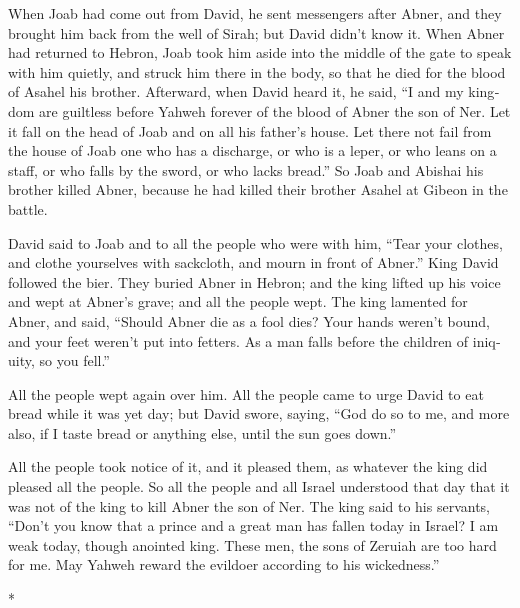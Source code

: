 \begin{paracol}{2}
\begin{otherlanguage}{english}
 When Joab had come out from David, he sent messengers
after Abner, and they brought him back from the well of Sirah; but David
didn't know it.  When Abner had returned to Hebron, Joab
took him aside into the middle of the gate to speak with him quietly,
and struck him there in the body, so that he died for the blood of
Asahel his brother.  Afterward, when David heard it, he
said, ``I and my kingdom are guiltless before Yahweh forever of the
blood of Abner the son of Ner.  Let it fall on the head
of Joab and on all his father's house. Let there not fail from the house
of Joab one who has a discharge, or who is a leper, or who leans on a
staff, or who falls by the sword, or who lacks bread.'' 
So Joab and Abishai his brother killed Abner, because he had killed
their brother Asahel at Gibeon in the battle.

 David said to Joab and to all the people who were with
him, ``Tear your clothes, and clothe yourselves with sackcloth, and
mourn in front of Abner.'' King David followed the bier. 
They buried Abner in Hebron; and the king lifted up his voice and wept
at Abner's grave; and all the people wept.  The king
lamented for Abner, and said, ``Should Abner die as a fool dies?
 Your hands weren't bound, and your feet weren't put into
fetters. As a man falls before the children of iniquity, so you fell.''

All the people wept again over him.  All the people came
to urge David to eat bread while it was yet day; but David swore,
saying, ``God do so to me, and more also, if I taste bread or anything
else, until the sun goes down.''

 All the people took notice of it, and it pleased them,
as whatever the king did pleased all the people.  So all
the people and all Israel understood that day that it was not of the
king to kill Abner the son of Ner.  The king said to his
servants, ``Don't you know that a prince and a great man has fallen
today in Israel?  I am weak today, though anointed king.
These men, the sons of Zeruiah are too hard for me. May Yahweh reward
the evildoer according to his wickedness.''

\end{otherlanguage}

\switchcolumn[0]*

\hypertarget{asesinato-de-isboseth-coronaciuxf3n-de-david-como-rey-de-todo-israel}{%
}
\end{paracol}
